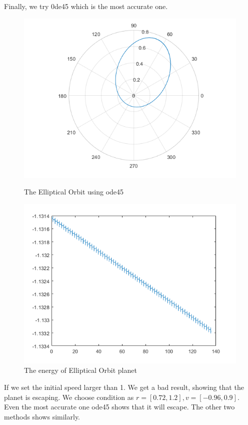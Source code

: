 \documentclass{article}
\begin{document}
Finally, we try 0de45 which is the most accurate one.
\begin{figure}[htbp]
    \centering
    \begin{minipage}{0.45\linewidth}
        \centering
        \includegraphics[width=0.8\linewidth]{br3.png}
        \caption{The Elliptical Orbit using ode45}
    \end{minipage}
    \hfill
    \begin{minipage}{0.45\linewidth}
        \centering
        \includegraphics[width=0.8\linewidth]{br31.png}
        \caption{The energy of Elliptical Orbit planet}
    \end{minipage}
\end{figure}
\clearpage
If we set the initial speed larger than 1. We get a bad result, showing that the planet is escaping. We choose condition as $r=[0.72,1.2],v=[-0.96,0.9]$. Even the most accurate one ode45 shows that it will escape. The other two methods shows similarly.
\end{document}
